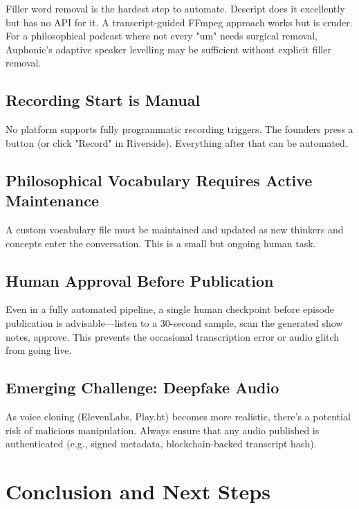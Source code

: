 \documentclass[11pt,letterpaper]{article}
\begin{document}
Filler word removal is the hardest step to automate. Descript does it excellently but has no API for it. A transcript-guided FFmpeg approach works but is cruder. For a philosophical podcast where not every "um" needs surgical removal, Auphonic's adaptive speaker levelling may be sufficient without explicit filler removal.

\subsection{Recording Start is Manual}

No platform supports fully programmatic recording triggers. The founders press a button (or click "Record" in Riverside). Everything after that can be automated.

\subsection{Philosophical Vocabulary Requires Active Maintenance}

A custom vocabulary file must be maintained and updated as new thinkers and concepts enter the conversation. This is a small but ongoing human task.

\subsection{Human Approval Before Publication}

Even in a fully automated pipeline, a single human checkpoint before episode publication is advisable—listen to a 30-second sample, scan the generated show notes, approve. This prevents the occasional transcription error or audio glitch from going live.

\subsection{Emerging Challenge: Deepfake Audio}

As voice cloning (ElevenLabs, Play.ht) becomes more realistic, there's a potential risk of malicious manipulation. Always ensure that any audio published is authenticated (e.g., signed metadata, blockchain-backed transcript hash).

\vspace{12pt}

\section{Conclusion and Next Steps}
\end{document}
